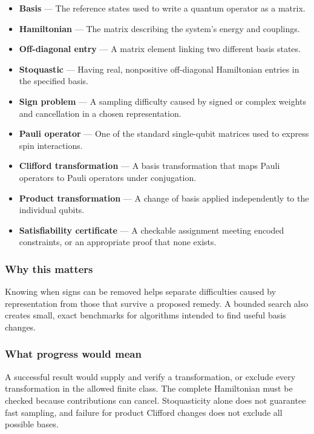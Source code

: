 \documentclass[
  11pt,
]{article}
\newcounter{none} %
\begin{document}
\begin{itemize}
\item
  \textbf{Basis} --- The reference states used to write a quantum
  operator as a matrix.
\item
  \textbf{Hamiltonian} --- The matrix describing the system's energy and
  couplings.
\item
  \textbf{Off-diagonal entry} --- A matrix element linking two different
  basis states.
\item
  \textbf{Stoquastic} --- Having real, nonpositive off-diagonal
  Hamiltonian entries in the specified basis.
\item
  \textbf{Sign problem} --- A sampling difficulty caused by signed or
  complex weights and cancellation in a chosen representation.
\item
  \textbf{Pauli operator} --- One of the standard single-qubit matrices
  used to express spin interactions.
\item
  \textbf{Clifford transformation} --- A basis transformation that maps
  Pauli operators to Pauli operators under conjugation.
\item
  \textbf{Product transformation} --- A change of basis applied
  independently to the individual qubits.
\item
  \textbf{Satisfiability certificate} --- A checkable assignment meeting
  encoded constraints, or an appropriate proof that none exists.
\end{itemize}

\subsubsection{Why this matters}

Knowing when signs can be removed helps separate difficulties caused by
representation from those that survive a proposed remedy. A bounded
search also creates small, exact benchmarks for algorithms intended to
find useful basis changes.

\subsubsection{What progress would mean}

A successful result would supply and verify a transformation, or exclude
every transformation in the allowed finite class. The complete
Hamiltonian must be checked because contributions can cancel.
Stoquasticity alone does not guarantee fast sampling, and failure for
product Clifford changes does not exclude all possible bases.
\end{document}
